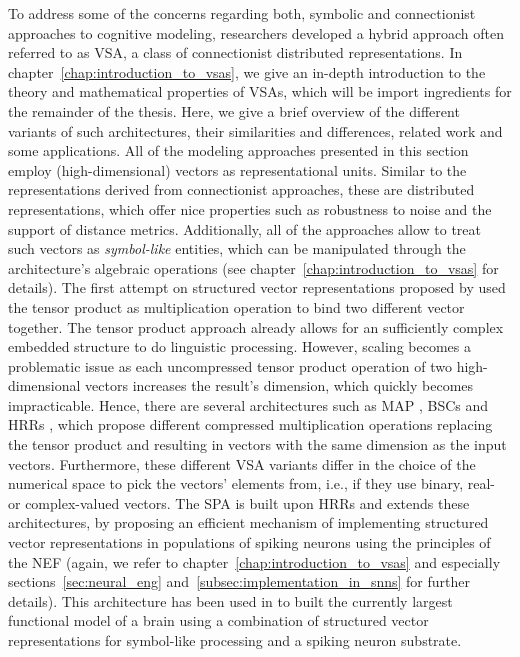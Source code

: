 To address some of the concerns regarding both, symbolic and connectionist approaches to cognitive modeling, researchers developed a hybrid approach often referred to as \acf{VSA}, a class of connectionist distributed representations.
In chapter~\ref{chap:introduction_to_vsas}, we give an in-depth introduction to the theory and mathematical properties of \acp{VSA}, which will be import ingredients for the remainder of the thesis.
Here, we give a brief overview of the different variants of such architectures, their similarities and differences, related work and some applications.
All of the modeling approaches presented in this section employ (high-dimensional) vectors as representational units.
Similar to the representations derived from connectionist approaches, these are distributed representations, which offer nice properties such as robustness to noise and the support of distance metrics.
Additionally, all of the approaches allow to treat such vectors as \emph{symbol-like} entities, which can be manipulated through the architecture's algebraic operations (see chapter~\ref{chap:introduction_to_vsas} for details).
The first attempt on structured vector representations proposed by \textcite{Smolensky1990} used the tensor product as multiplication operation to bind two different vector together.
The tensor product approach already allows for an sufficiently complex embedded structure to do linguistic processing.
However, scaling becomes a problematic issue as each uncompressed tensor product operation of two high-dimensional vectors increases the result's dimension, which quickly becomes impracticable.
Hence, there are several architectures such as \ac{MAP} \parencite{Gayler1998, Gayler2003}, \acp{BSC} \parencite{Kanerva1988} and \acp{HRR} \parencite{Plate1991, Plate1994}, which propose different compressed multiplication operations replacing the tensor product and resulting in vectors with the same dimension as the input vectors.
Furthermore, these different \ac{VSA} variants differ in the choice of the numerical space to pick the vectors' elements from, i.e., if they use binary, real- or complex-valued vectors. 
The \ac{SPA} \parencite{Eliasmith2013} is built upon \acp{HRR} and extends these architectures, by proposing an efficient mechanism of implementing structured vector representations in populations of spiking neurons using the principles of the \ac{NEF} \parencite{Eliasmith2003} (again, we refer to chapter~\ref{chap:introduction_to_vsas} and especially sections~\ref{sec:neural_eng} and~\ref{subsec:implementation_in_snns} for further details).   
This architecture has been used in \textcite{Eliasmith2012} to built the currently largest functional model of a brain using a combination of structured vector representations for symbol-like processing and a spiking neuron substrate.


